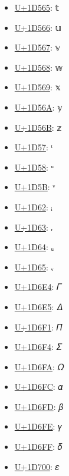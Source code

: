 \begin{itemize}
	\item \href{https://www.compart.com/en/unicode/U+1D565}{U+1D565}: 𝕥
	\item \href{https://www.compart.com/en/unicode/U+1D566}{U+1D566}: 𝕦
	\item \href{https://www.compart.com/en/unicode/U+1D567}{U+1D567}: 𝕧
	\item \href{https://www.compart.com/en/unicode/U+1D568}{U+1D568}: 𝕨
	\item \href{https://www.compart.com/en/unicode/U+1D569}{U+1D569}: 𝕩
	\item \href{https://www.compart.com/en/unicode/U+1D56A}{U+1D56A}: 𝕪
	\item \href{https://www.compart.com/en/unicode/U+1D56B}{U+1D56B}: 𝕫
	\item \href{https://www.compart.com/en/unicode/U+1D57}{U+1D57}: ᵗ
	\item \href{https://www.compart.com/en/unicode/U+1D58}{U+1D58}: ᵘ
	\item \href{https://www.compart.com/en/unicode/U+1D5B}{U+1D5B}: ᵛ
	\item \href{https://www.compart.com/en/unicode/U+1D62}{U+1D62}: ᵢ
	\item \href{https://www.compart.com/en/unicode/U+1D63}{U+1D63}: ᵣ
	\item \href{https://www.compart.com/en/unicode/U+1D64}{U+1D64}: ᵤ
	\item \href{https://www.compart.com/en/unicode/U+1D65}{U+1D65}: ᵥ
	\item \href{https://www.compart.com/en/unicode/U+1D6E4}{U+1D6E4}: 𝛤
	\item \href{https://www.compart.com/en/unicode/U+1D6E5}{U+1D6E5}: 𝛥
	\item \href{https://www.compart.com/en/unicode/U+1D6F1}{U+1D6F1}: 𝛱
	\item \href{https://www.compart.com/en/unicode/U+1D6F4}{U+1D6F4}: 𝛴
	\item \href{https://www.compart.com/en/unicode/U+1D6FA}{U+1D6FA}: 𝛺
	\item \href{https://www.compart.com/en/unicode/U+1D6FC}{U+1D6FC}: 𝛼
	\item \href{https://www.compart.com/en/unicode/U+1D6FD}{U+1D6FD}: 𝛽
	\item \href{https://www.compart.com/en/unicode/U+1D6FE}{U+1D6FE}: 𝛾
	\item \href{https://www.compart.com/en/unicode/U+1D6FF}{U+1D6FF}: 𝛿
	\item \href{https://www.compart.com/en/unicode/U+1D700}{U+1D700}: 𝜀

\end{itemize}
